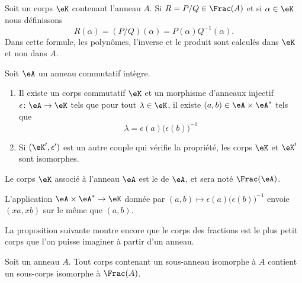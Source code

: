 \begin{definition}       \label{DEFooLBIWooCPCaSY}
    Soit un corps \( \eK\) contenant l'anneau \( A\). Si \( R=P/Q\in \Frac(A)\) et si \( \alpha\in \eK\) nous définissons
    \begin{equation}
        R(\alpha)=(P/Q)(\alpha)=P(\alpha)Q^{-1}(\alpha).
    \end{equation}
    Dans cette formule, les polynômes, l'inverse et le produit sont calculés dans \( \eK\) et non dans \( A\).
\end{definition}

\begin{theoremDef}     \label{ThogbhWgo}
    Soit \( \eA\) un anneau commutatif intègre.

    \begin{enumerate}
        \item
    Il existe un corps commutatif \( \eK\) et un morphisme d'anneaux injectif \( \epsilon\colon \eA\to \eK\) tels que pour tout \( \lambda\in\eK\), il existe \( (a,b)\in \eA\times \eA^*\) tels que
    \begin{equation}
        \lambda=\epsilon(a)\big( \epsilon(b) \big)^{-1}
    \end{equation}
\item
    Si \( (\eK',\epsilon')\) est un autre couple qui vérifie la propriété, les corps \( \eK\) et \( \eK'\) sont isomorphes.
    \end{enumerate}

    Le corps \( \eK\) associé à l'anneau \( \eA\) est le  de \( \eA\), et sera noté \( \Frac(\eA)\).
\end{theoremDef}

\begin{lemma}
    L'application \( \eA\times \eA^*\to \eK\) donnée par \( (a,b)\mapsto \epsilon(a)\big( \epsilon(b) \big)^{-1}\) envoie \( (xa,xb)\) sur le même que \( (a,b)\).
\end{lemma}

La proposition suivante montre encore que le corps des fractions est le plus petit corps que l'on puisse imaginer à partir d'un anneau.
\begin{proposition}
    Soit un anneau \( A\). Tout corps contenant un sous-anneau isomorphe à \( A\) contient un sous-corps isomorphe à \( \Frac(A)\).
\end{proposition}

